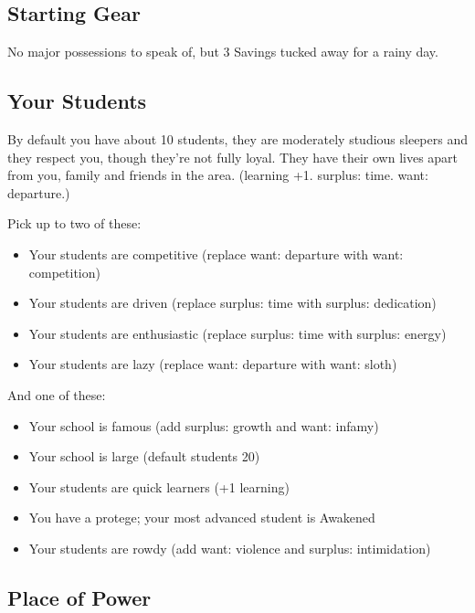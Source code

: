 \documentclass[
  oneside,
  statementpaper,
  9pt]{memoir}
\begin{document}
\hypertarget{starting-gear-3}{%
\subsection{Starting Gear}\label{starting-gear-3}}

No major possessions to speak of, but 3 Savings tucked away for a rainy
day.

\hypertarget{your-students}{%
\subsection{Your Students}\label{your-students}}

By default you have about 10 students, they are moderately studious
sleepers and they respect you, though they're not fully loyal. They have
their own lives apart from you, family and friends in the area.
(learning +1. surplus: time. want: departure.)

Pick up to two of these:

\begin{itemize}
\tightlist
\item
  Your students are competitive (replace want: departure with want:
  competition)
\item
  Your students are driven (replace surplus: time with surplus:
  dedication)
\item
  Your students are enthusiastic (replace surplus: time with surplus:
  energy)
\item
  Your students are lazy (replace want: departure with want: sloth)
\end{itemize}

And one of these:

\begin{itemize}
\tightlist
\item
  Your school is famous (add surplus: growth and want: infamy)
\item
  Your school is large (default students 20)
\item
  Your students are quick learners (+1 learning)
\item
  You have a protege; your most advanced student is Awakened
\item
  Your students are rowdy (add want: violence and surplus: intimidation)
\end{itemize}

\hypertarget{place-of-power-2}{%
\subsection{Place of Power}\label{place-of-power-2}}
\end{document}
